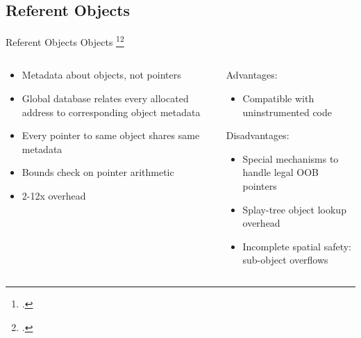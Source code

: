 \documentclass[aspectratio=169]{beamer}
\begin{document}
\subsection{Referent Objects}

\begin{frame}[fragile]{Referent Objects}
    Objects \footcite{jones_backwards-compatible_1997}\footcite{ruwase_practical_2004}
\footnotesize
\begin{columns}[T]
\begin{column}{0.45\textwidth}
\begin{itemize}[<+->]
    \item Metadata about \alert{objects}, not pointers
    \item Global database relates every allocated address to corresponding object metadata 
    \item Every pointer to same object shares same metadata
    \item Bounds check on \alert{pointer arithmetic} 
    \item 2-12x overhead
\end{itemize}
\end{column}

\pause

\begin{column}{0.45\textwidth}
Advantages:
\begin{itemize}
  \item Compatible with uninstrumented code 
\end{itemize}
\pause
Disadvantages:
\begin{itemize}
  \item Special mechanisms to handle legal OOB pointers 
  \item Splay-tree object lookup overhead
  \item Incomplete spatial safety: \alert{sub-object overflows} 
\end{itemize}
\end{column}
\end{columns}

\vspace{0.1in}

\end{frame}
\end{document}
